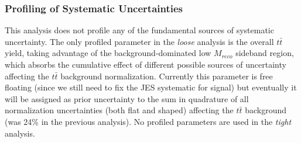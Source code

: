 \subsubsection{Profiling of Systematic Uncertainties}
This analysis does not profile any of the fundamental sources of systematic uncertainty. The only profiled parameter
in the {\sl loose} analysis is the overall $t\bar{t}$ yield, taking advantage of the background-dominated
low $M_{reco}$ sideband region, which absorbs the cumulative effect of different possible sources of uncertainty
affecting the $t\bar{t}$ background normalization. Currently this parameter is free floating (since we still need to fix the
JES systematic for signal) but eventually it will be assigned as prior uncertainty to the sum in quadrature of all normalization 
uncertainties (both flat and shaped) affecting the $t\bar{t}$ background (was 24\% in the previous analysis). 
No profiled parameters are used in the {\sl tight} analysis.







